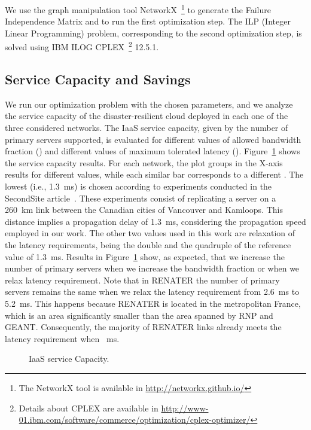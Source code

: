 \documentclass[preprint]{elsarticle}
\begin{document}
We use the graph manipulation tool NetworkX~\footnote{The NetworkX tool is available in \url{http://networkx.github.io/}} to generate the Failure Independence Matrix and to run the first optimization step. The ILP (Integer Linear Programming) problem, corresponding to the second optimization step, is solved using IBM ILOG CPLEX~\footnote{Details about CPLEX are available in \url{http://www-01.ibm.com/software/commerce/optimization/cplex-optimizer/}} 12.5.1.

\subsection{Service Capacity and Savings}

We run our optimization problem with the chosen parameters, and we analyze the service capacity of the disaster-resilient cloud deployed in each one of the three considered networks. The IaaS service capacity, given by the number of primary servers supported, is evaluated for different values of allowed bandwidth fraction () and different values of maximum tolerated latency (). 
Figure~\ref{zeroRPOfig:totalNrServers} shows the service capacity results. For each network, the plot groups in the X-axis results for different  values, while each similar bar corresponds to a different . The lowest  (i.e., 1.3~ms) is chosen according to experiments conducted in the SecondSite article~\cite{rajagopalan2012secondsite}. These experiments consist of replicating a server on a 260~km link between the Canadian cities of Vancouver and Kamloops. This distance implies a propagation delay of 1.3~ms, considering the propagation speed employed in our work. The other two  values used in this work are relaxation of the latency requirements, being the double and the quadruple of the reference value of 1.3~ms.
Results in Figure~\ref{zeroRPOfig:totalNrServers} show, as expected, that we increase the number of primary servers when we increase the bandwidth fraction or when we relax latency requirement. Note that in RENATER the number of primary servers remains the same when we relax the latency requirement from 2.6~ms to 5.2~ms. This happens because RENATER is located in the metropolitan France, which is an area significantly smaller than the area spanned by RNP and GEANT. Consequently, the majority of RENATER links already meets the latency requirement when ~ms.
\begin{figure}[ht!]
\centering
{}
\caption{IaaS service Capacity.}
\label{zeroRPOfig:totalNrServers}
\end{figure}
\end{document}
